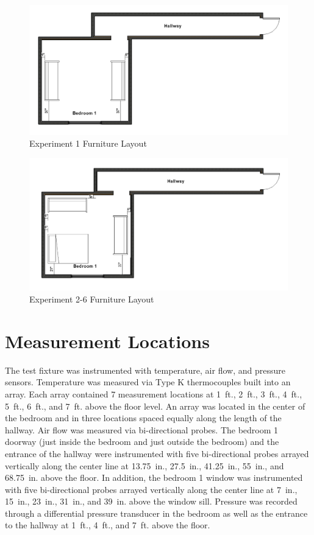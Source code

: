 \documentclass[12pt,oneside]{book}
\begin{document}
\begin{figure}[H]
	\centering
	\includegraphics[width=\textwidth]{Figures/Furniture/Exp1FurnitureDimensions.png}
	\caption{Experiment 1 Furniture Layout}
	\label{fig:Exp1FurnitureDim}
\end{figure}

\begin{figure}[H]
	\centering
	\includegraphics[width=\textwidth]{Figures/Furniture/Exp2to6FurnitureDimensions.png}
	\caption{Experiment 2-6 Furniture Layout}
	\label{fig:Exp2to6FurnitureDim}
\end{figure}

\section{Measurement Locations}

The test fixture was instrumented with temperature, air flow, and pressure sensors. Temperature was measured via Type K thermocouples built into an array. Each array contained 7 measurement locations at 1~ft., 2~ft., 3~ft., 4~ft., 5~ft., 6~ft., and 7~ft. above the floor level. An array was located in the center of the bedroom and in three locations spaced equally along the length of the hallway. Air flow was measured via bi-directional probes. The bedroom 1 doorway (just inside the bedroom and just outside the bedroom) and the entrance of the hallway were instrumented with five bi-directional probes arrayed vertically along the center line at 13.75~in., 27.5~in., 41.25~in., 55~in., and 68.75~in. above the floor. In addition, the bedroom 1 window was instrumented with five bi-directional probes arrayed vertically along the center line at 7~in., 15~in., 23~in., 31~in., and 39~in. above the window sill. Pressure was recorded through a differential pressure transducer in the bedroom as well as the entrance to the hallway at 1~ft., 4~ft., and 7~ft. above the floor. 
\end{document}
